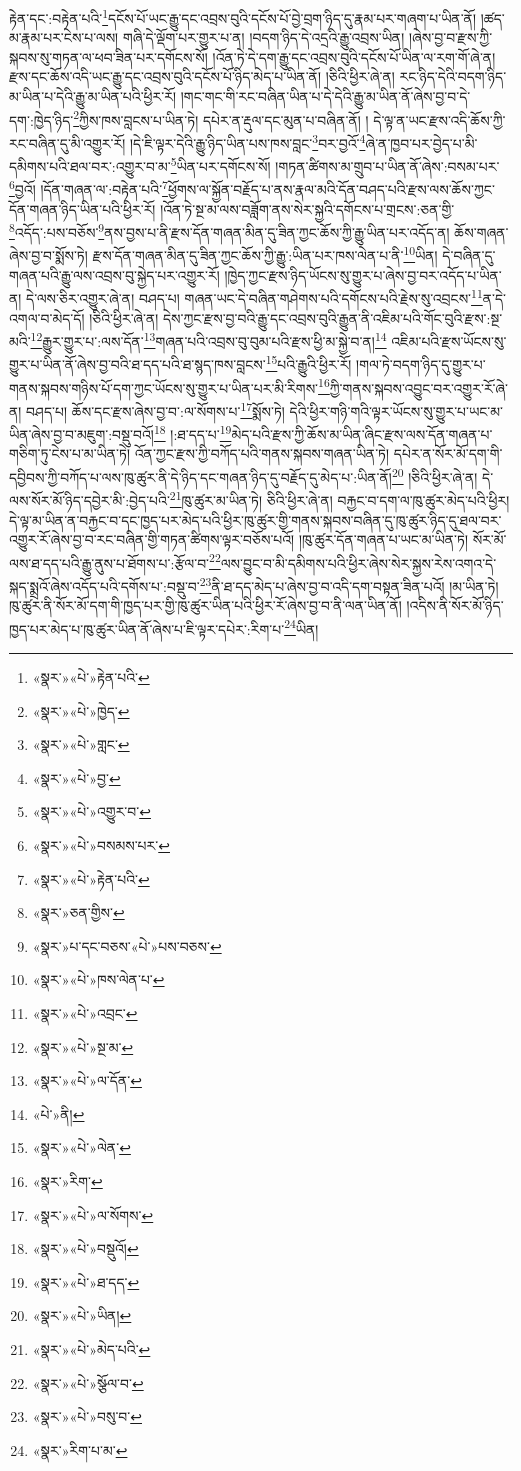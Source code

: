 རྟེན་དང་:བརྟེན་པའི་\footnote{«སྣར་»«པེ་»རྟེན་པའི་}དངོས་པོ་ཡང་རྒྱུ་དང་འབྲས་བུའི་དངོས་པོ་བྱེ་བྲག་ཉིད་དུ་རྣམ་པར་གཞག་པ་ཡིན་ནོ། །ཚད་མ་རྣམ་པར་ངེས་པ་ལས། གཞི་དེ་ལྡོག་པར་གྱུར་པ་ན། །བདག་ཉིད་དེ་འདྲའི་རྒྱུ་འབྲས་ཡིན། །ཞེས་བྱ་བ་རྫས་ཀྱི་སྐབས་སུ་གཏན་ལ་ཕབ་ཟིན་པར་དགོངས་སོ། །འོན་ཏེ་དེ་དག་རྒྱུ་དང་འབྲས་བུའི་དངོས་པོ་ཡིན་ལ་རག་གོ་ཞེ་ན། རྫས་དང་ཆོས་འདི་ཡང་རྒྱུ་དང་འབྲས་བུའི་དངོས་པོ་ཉིད་མེད་པ་ཡིན་ནོ། །ཅིའི་ཕྱིར་ཞེ་ན། རང་ཉིད་དེའི་བདག་ཉིད་མ་ཡིན་པ་དེའི་རྒྱུ་མ་ཡིན་པའི་ཕྱིར་རོ། །གང་གང་གི་རང་བཞིན་ཡིན་པ་དེ་དེའི་རྒྱུ་མ་ཡིན་ནོ་ཞེས་བྱ་བ་དེ་དག་:ཁྱེད་ཉིད་\footnote{«སྣར་»«པེ་»ཁྱེད་}ཀྱིས་ཁས་བླངས་པ་ཡིན་ཏེ། དཔེར་ན་རྡུལ་དང་མུན་པ་བཞིན་ནོ། །
དེ་ལྟ་ན་ཡང་རྫས་འདི་ཆོས་ཀྱི་རང་བཞིན་དུ་མི་འགྱུར་རོ། །དེ་ཇི་ལྟར་དེའི་རྒྱུ་ཉིད་ཡིན་པས་ཁས་བླང་\footnote{«སྣར་»«པེ་»གླང་}བར་བྱའོ་\footnote{«སྣར་»«པེ་»བྱ་}ཞེ་ན་ཁྱབ་པར་བྱེད་པ་མི་དམིགས་པའི་ཐལ་བར་:འགྱུར་བ་མ་\footnote{«སྣར་»«པེ་»འགྱུར་བ་}ཡིན་པར་དགོངས་སོ། །གཏན་ཚིགས་མ་གྲུབ་པ་ཡིན་ནོ་ཞེས་:བསམ་པར་\footnote{«སྣར་»«པེ་»བསམས་པར་}བྱའོ། །དོན་གཞན་ལ་:བརྟེན་པའི་\footnote{«སྣར་»«པེ་»རྟེན་པའི་}ཕྱོགས་ལ་སྐྱོན་བརྗོད་པ་ནས་རྣལ་མའི་དོན་བཤད་པའི་རྫས་ལས་ཆོས་ཀྱང་དོན་གཞན་ཉིད་ཡིན་པའི་ཕྱིར་རོ། །འོན་ཏེ་སྔ་མ་ལས་བཟློག་ནས་སེར་སྐྱའི་དགོངས་པ་གྲངས་:ཅན་གྱི་\footnote{«སྣར་»ཅན་གྱིས་}འདོད་:པས་བཅོས་\footnote{«སྣར་»པ་དང་བཅས་«པེ་»པས་བཅས་}ནས་བྱས་པ་ནི་རྫས་དོན་གཞན་མིན་དུ་ཟིན་ཀྱང་ཆོས་ཀྱི་རྒྱུ་ཡིན་པར་འདོད་ན། ཆོས་གཞན་ཞེས་བྱ་བ་སྨོས་ཏེ། རྫས་དོན་གཞན་མིན་དུ་ཟིན་ཀྱང་ཆོས་ཀྱི་རྒྱུ་:ཡིན་པར་ཁས་ལེན་པ་ནི་\footnote{«སྣར་»«པེ་»ཁས་ལེན་པ་}ཡིན། དེ་བཞིན་དུ་གཞན་པའི་རྒྱུ་ལས་འབྲས་བུ་སྐྱེད་པར་འགྱུར་རོ། །ཁྱེད་ཀྱང་རྫས་ཉིད་ཡོངས་སུ་གྱུར་པ་ཞེས་བྱ་བར་འདོད་པ་ཡིན་ན། དེ་ལས་ཅིར་འགྱུར་ཞེ་ན། བཤད་པ། གཞན་ཡང་དེ་བཞིན་གཤེགས་པའི་དགོངས་པའི་རྗེས་སུ་འབྲངས་\footnote{«སྣར་»«པེ་»འབྲང་}ན་དེ་འགལ་བ་མེད་དོ། །ཅིའི་ཕྱིར་ཞེ་ན། དེས་ཀྱང་རྫས་བྱ་བའི་རྒྱུ་དང་འབྲས་བུའི་རྒྱུན་ནི་འཇིམ་པའི་གོང་བུའི་རྫས་:སྔ་མའི་\footnote{«སྣར་»«པེ་»སྔ་མ་}རྒྱུར་གྱུར་པ་:ལས་དོན་\footnote{«སྣར་»«པེ་»ལ་དོན་}གཞན་པའི་འབྲས་བུ་བུམ་པའི་རྫས་ཕྱི་མ་སྐྱེ་བ་ན།\footnote{«པེ་»ནི།} འཇིམ་པའི་རྫས་ཡོངས་སུ་གྱུར་པ་ཡིན་ནོ་ཞེས་བྱ་བའི་ཐ་དད་པའི་ཐ་སྙད་ཁས་བླངས་\footnote{«སྣར་»«པེ་»ལེན་}པའི་རྒྱུའི་ཕྱིར་རོ། །གལ་ཏེ་བདག་ཉིད་དུ་གྱུར་པ་གནས་སྐབས་གཉིས་པོ་དག་ཀྱང་ཡོངས་སུ་གྱུར་པ་ཡིན་པར་མི་རིགས་\footnote{«སྣར་»རིག་}ཀྱི་གནས་སྐབས་འབྱུང་བར་འགྱུར་རོ་ཞེ་ན། བཤད་པ། ཆོས་དང་རྫས་ཞེས་བྱ་བ་:ལ་སོགས་པ་\footnote{«སྣར་»«པེ་»ལ་སོགས་}སྨོས་ཏེ། དེའི་ཕྱིར་གཉི་གའི་ལྟར་ཡོངས་སུ་གྱུར་པ་ཡང་མ་ཡིན་ཞེས་བྱ་བ་མཇུག་:བསྡུ་བའོ།\footnote{«སྣར་»«པེ་»བསྡུའོ།} །:ཐ་དད་པ་\footnote{«སྣར་»«པེ་»ཐ་དད་}མེད་པའི་རྫས་ཀྱི་ཆོས་མ་ཡིན་ཞིང་རྫས་ལས་དོན་གཞན་པ་གཅིག་ཏུ་ངེས་པ་མ་ཡིན་ཏེ། འོན་ཀྱང་རྫས་ཀྱི་བཀོད་པའི་གནས་སྐབས་གཞན་ཡིན་ཏེ། དཔེར་ན་སོར་མོ་དག་གི་དབྱིབས་ཀྱི་བཀོད་པ་ལས་ཁུ་ཚུར་ནི་དེ་ཉིད་དང་གཞན་ཉིད་དུ་བརྗོད་དུ་མེད་པ་:ཡིན་ནོ།\footnote{«སྣར་»«པེ་»ཡིན།} །ཅིའི་ཕྱིར་ཞེ་ན། དེ་ལས་སོར་མོ་ཉིད་དབྱེར་མི་:བྱེད་པའི་\footnote{«སྣར་»«པེ་»མེད་པའི་}ཁུ་ཚུར་མ་ཡིན་ཏེ། ཅིའི་ཕྱིར་ཞེ་ན། བརྐྱང་བ་དག་ལ་ཁུ་ཚུར་མེད་པའི་ཕྱིར། དེ་ལྟ་མ་ཡིན་ན་བརྐྱང་བ་དང་ཁྱད་པར་མེད་པའི་ཕྱིར་ཁུ་ཚུར་གྱི་གནས་སྐབས་བཞིན་དུ་ཁུ་ཚུར་ཉིད་དུ་ཐལ་བར་འགྱུར་རོ་ཞེས་བྱ་བ་རང་བཞིན་གྱི་གཏན་ཚིགས་ལྟར་བཅོས་པའོ། །ཁུ་ཚུར་དོན་གཞན་པ་ཡང་མ་ཡིན་ཏེ། སོར་མོ་ལས་ཐ་དད་པའི་རྒྱུ་ནུས་པ་ཐོགས་པ་:རྩོལ་བ་\footnote{«སྣར་»«པེ་»སྩོལ་བ་}ལས་བྱུང་བ་མི་དམིགས་པའི་ཕྱིར་ཞེས་སེར་སྐྱས་རེས་འགའ་དེ་སྐད་སྨྲའོ་ཞེས་འདོད་པའི་དགོས་པ་:བསྡུ་བ་\footnote{«སྣར་»«པེ་»བསུ་བ་}ནི་ཐ་དད་མེད་པ་ཞེས་བྱ་བ་འདི་དག་བསྟན་ཟིན་པའོ། །མ་ཡིན་ཏེ། ཁུ་ཚུར་ནི་སོར་མོ་དག་གི་ཁྱད་པར་གྱི་ཁུ་ཚུར་ཡིན་པའི་ཕྱིར་རོ་ཞེས་བྱ་བ་ནི་ལན་ཡིན་ནོ། །འདིས་ནི་སོར་མོ་ཉིད་ཁྱད་པར་མེད་པ་ཁུ་ཚུར་ཡིན་ནོ་ཞེས་པ་ཇི་ལྟར་དཔེར་:རིག་པ་\footnote{«སྣར་»རིག་པ་མ་}ཡིན། 